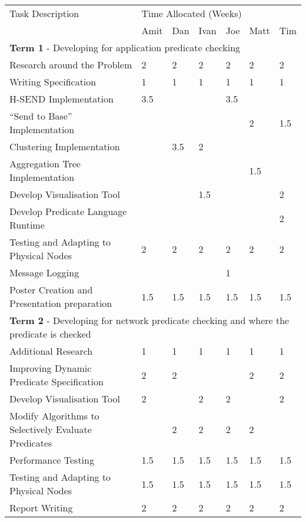 \begin{table}[H]
	\centering
	\begin{tabular}{| l | l | l | l | l | l | l |}
	\hline
	Task Description & \multicolumn{6}{l|}{Time Allocated (Weeks)}\\
	~ & Amit & Dan & Ivan & Joe & Matt & Tim \\
	\hline
	\hline
	\multicolumn{7}{|l|}{\textbf{Term 1} - Developing for application predicate checking} \\
	\hline


	Research around the Problem & 2 & 2 & 2 & 2 & 2 & 2\\
	Writing Specification & 1 & 1 & 1 & 1 & 1 & 1\\
	H-SEND Implementation & 3.5 & ~ & ~ & 3.5 & ~ & ~\\
	``Send to Base'' Implementation & ~ & ~ & ~ & ~ & 2 & 1.5\\
	Clustering Implementation & ~ & 3.5 & 2 & ~ & ~ & ~\\
	Aggregation Tree Implementation & ~ & ~ & ~ & ~ & 1.5 & ~\\
	Develop Visualisation Tool & ~ & ~ & 1.5 & ~ & ~ & 2\\
	Develop Predicate Language Runtime & ~ & ~ & ~ & ~ & ~ & 2\\
	Testing and Adapting to Physical Nodes & 2 & 2 & 2 & 2 & 2 & 2\\
	Message Logging & ~ & ~ & ~ & 1 & ~ & ~\\
	Poster Creation and Presentation preparation & 1.5 & 1.5 & 1.5 & 1.5 & 1.5 & 1.5\\

	\hline
	\hline
	\multicolumn{7}{|l|}{\textbf{Term 2} - Developing for network predicate checking and where the predicate is checked} \\
	\hline
	
	Additional Research & 1 & 1 & 1 & 1 & 1 & 1\\
	Improving Dynamic Predicate Specification & 2 & 2 & ~ & ~ & 2 & 2\\
	Develop Visualisation Tool & 2 & ~ & 2 & 2 & ~ & 2\\
	Modify Algorithms to Selectively Evaluate Predicates & ~ & 2 & 2 & 2 & 2 & ~\\
	Performance Testing & 1.5 & 1.5 & 1.5 & 1.5 & 1.5 & 1.5\\
	Testing and Adapting to Physical Nodes & 1.5 & 1.5 & 1.5 & 1.5 & 1.5 & 1.5\\
	Report Writing & 2 & 2 & 2 & 2 & 2 & 2\\
	\hline
	
	\end{tabular}
\end{table}

